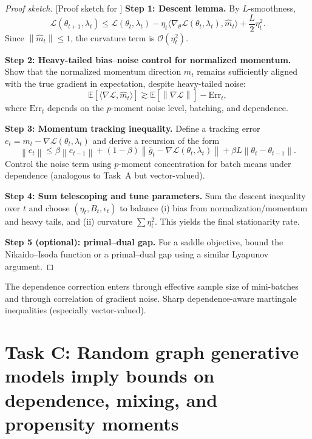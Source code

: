 \documentclass[11pt]{article}
\newcommand{\E}{\mathbb{E}}
\newcommand{\1}{\mathbf{1}}
\newcommand{\inner}[2]{\langle #1,#2\rangle}
\newcommand{\norm}[1]{\left\|#1\right\|}
\newcommand{\bigO}{\mathcal{O}}
\theoremstyle{plain}
\theoremstyle{definition}
\theoremstyle{remark}
\newenvironment{proofsketch}{\begin{proof}[Proof sketch]}{\end{proof}}
\begin{document}
\begin{proofsketch}[Proof sketch for ]
\textbf{Step 1: Descent lemma.}
By $L$-smoothness,
\[
\mathcal{L}(\theta_{t+1},\lambda_t)\le \mathcal{L}(\theta_t,\lambda_t)
-\eta_t\inner{\nabla_\theta \mathcal{L}(\theta_t,\lambda_t)}{\hat m_t}
+\frac{L}{2}\eta_t^2.
\]
Since $\norm{\hat m_t}\le 1$, the curvature term is $\bigO(\eta_t^2)$.

\textbf{Step 2: Heavy-tailed bias--noise control for normalized momentum.}
Show that the normalized momentum direction $\hat m_t$ remains sufficiently aligned with the true gradient
in expectation, despite heavy-tailed noise:
\[
\E\!\left[\inner{\nabla \mathcal{L}}{\hat m_t}\right]\gtrsim \E[\norm{\nabla \mathcal{L}}] - \mathrm{Err}_t,
\]
where $\mathrm{Err}_t$ depends on the $p$-moment noise level, batching, and dependence.

\textbf{Step 3: Momentum tracking inequality.}
Define a tracking error $e_t=m_t-\nabla \mathcal{L}(\theta_t,\lambda_t)$ and derive a recursion of the form
\[
\norm{e_t}\le \beta\norm{e_{t-1}} + (1-\beta)\norm{\bar g_t-\nabla \mathcal{L}(\theta_t,\lambda_t)} + \beta L \norm{\theta_t-\theta_{t-1}}.
\]
Control the noise term using $p$-moment concentration for batch means under dependence
(analogous to Task~A but vector-valued).

\textbf{Step 4: Sum telescoping and tune parameters.}
Sum the descent inequality over $t$ and choose $(\eta_t,B_t,\epsilon_t)$ to balance
(i) bias from normalization/momentum and heavy tails, and (ii) curvature $\sum \eta_t^2$.
This yields the final stationarity rate.

\textbf{Step 5 (optional): primal--dual gap.}
For a saddle objective, bound the Nikaido--Isoda function or a primal--dual gap using a similar Lyapunov argument.
\end{proofsketch}

The dependence correction enters through effective sample size of mini-batches and through correlation of gradient noise.
Sharp dependence-aware martingale inequalities (especially vector-valued).

\section{Task C: Random graph generative models imply bounds on dependence, mixing, and propensity moments}
\label{sec:C}
\end{document}
